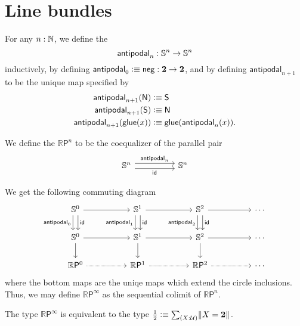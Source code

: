 \documentclass{article}
\newcommand{\projective}[1]{\mathbb{R}\mathsf{P}^{#1}}
\newcommand{\antipodal}[1]{\mathsf{antipodal}_{#1}}
\begin{document}
\section{Line bundles}

\begin{defn}
For any $n:\mathbb{N}$, we define the  
\begin{equation*}
\antipodal{n}:\Sn^n\to\Sn^n
\end{equation*} 
inductively, by defining $\antipodal{0}\defeq\mathsf{neg}:\bool\to\bool$, and by defining
$\antipodal{n+1}$ to be the unique map specified by
\begin{align*}
\antipodal{n+1}(\north) & \defeq\south \\
\antipodal{n+1}(\south) & \defeq\north \\
\ap{\antipodal{n+1}}{\glue(x)} & \defeq \glue(\antipodal{n}(x)).
\end{align*}
\end{defn}

\begin{defn}
We define the  $\projective{n}$ to be the coequalizer of the parallel pair
\begin{equation*}
\begin{tikzcd}[column sep=huge]
\Sn^n\arrow[r,yshift=.7ex,"\antipodal{n}"] \arrow[r,yshift=-.7ex,swap,"\idfunc"] & \Sn^n
\end{tikzcd}
\end{equation*}
\end{defn}

\begin{defn}
We get the following commuting diagram
\begin{equation*}
\begin{tikzcd}[column sep=huge]
\Sn^0 \arrow[r] \arrow[d,xshift=-.7ex,swap,"\mathsf{antipodal}_0"] \arrow[d,xshift=.7ex,"\idfunc"]
& \Sn^1 \arrow[r] \arrow[d,xshift=-.7ex,swap,"\mathsf{antipodal}_1"] \arrow[d,xshift=.7ex,"\idfunc"]
& \Sn^2 \arrow[r] \arrow[d,xshift=-.7ex,swap,"\mathsf{antipodal}_2"] \arrow[d,xshift=.7ex,"\idfunc"]
& \cdots \\
\Sn^0 \arrow[r] \arrow[d] & \Sn^1 \arrow[r] \arrow[d] & \Sn^2 \arrow[r] \arrow[d] & \cdots \\
\projective{0} \arrow[r,densely dotted] & \projective{1} \arrow[r,densely dotted] & \projective{2} \arrow[r,densely dotted] & \cdots
\end{tikzcd}
\end{equation*}
where the bottom maps are the uniqe maps which extend the circle inclusions.
Thus, we may define $\projective{\infty}$ as the sequential colimit of $\projective{n}$. 
\end{defn}

\begin{conj}
The type $\projective{\infty}$ is equivalent to the type $\frac{1}{2}\defeq\sm{X:\UU}\brck{X=\bool}$. 
\end{conj}
\end{document}
